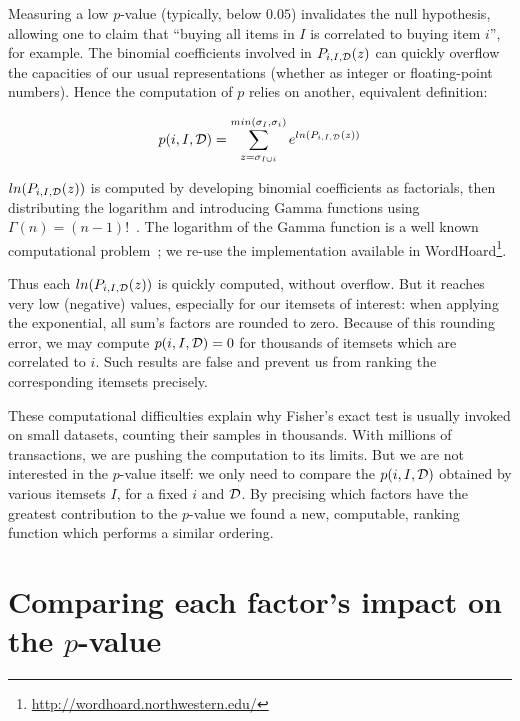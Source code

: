 Measuring a low $p$-value (typically, below $0.05$) invalidates the null hypothesis,
allowing one to claim that
``buying all items in $I$ is correlated to buying item $i$'', for example.
The binomial coefficients involved in $P_{i,I,{\cal D}}(z)$
can quickly overflow the capacities of our usual representations
(whether as integer or floating-point numbers).
Hence the computation of $p$ relies on another, equivalent definition:

\begin{equation}
	\label{eq:expP}
	p(i,I,{\cal D}) = \sum_{z=\sigma_{I \cup i}}^{min(\sigma_{I}, \sigma_{i})}
					{  e^{ ln(P_{i,I,{\cal D}}(z))}  }
\end{equation}

$ln(P_{i,I,{\cal D}}(z))$ is computed by
developing binomial coefficients as factorials,
then distributing the logarithm
and introducing Gamma functions using $\Gamma(n)=(n-1)!$~.
The logarithm of the Gamma function is a well known computational problem~\cite{CodyMC67};
we re-use the implementation available in WordHoard\footnote{\url{http://wordhoard.northwestern.edu/}}.

Thus each $ln(P_{i,I,{\cal D}}(z))$ is quickly computed, without overflow.
But it reaches very low (negative) values, especially for our itemsets of interest:
when applying the exponential,
all sum's factors are rounded to zero.
Because of this rounding error,
we may compute $p(i,I,{\cal D})=0$ for thousands of itemsets which are correlated to $i$.
Such results are false and prevent us from ranking the corresponding itemsets precisely.

These computational difficulties explain why
Fisher's exact test is usually invoked on small datasets,
counting their samples in thousands.
With millions of transactions, we are pushing the computation to its limits.
But we are not interested in the $p$-value itself:
we only need to compare the $p(i,I,{\cal D})$ obtained by various itemsets $I$,
for a fixed $i$ and ${\cal D}$.
By precising which factors have the greatest contribution to the $p$-value
we found a new, computable, ranking function which performs a similar ordering.





\section{Comparing each factor's impact on the $p$-value}
\label{sec:fisher:factors}

